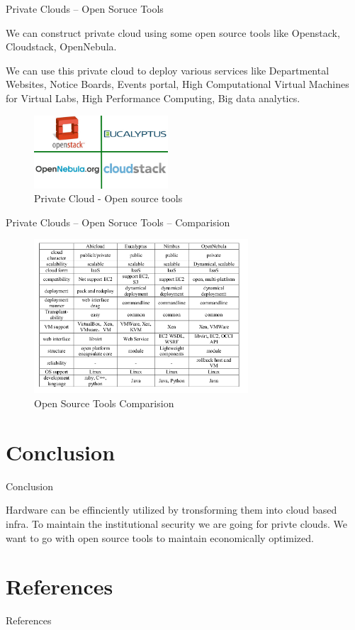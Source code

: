 \documentclass[xcolor=dvipsnames]{beamer}
\begin{document}
\begin{frame}{Private Clouds -- Open Soruce Tools}

We can construct private cloud using some open source tools like Openstack, Cloudstack, OpenNebula. \\

\hspace{4cm} 

We can use this private cloud to deploy various services like Departmental Websites, Notice Boards, Events portal, High Computational Virtual Machines for Virtual Labs, High Performance Computing, Big data analytics.
\begin{figure}[H]
 \centering
 \includegraphics[width=5cm]{./cloud.jpg}
 \caption{Private Cloud - Open source tools \label{fig:cloud} }
\end{figure}

\end{frame}

\begin{frame}{Private Clouds -- Open Soruce Tools -- Comparision}

\begin{figure}[H]
 \centering
 \includegraphics[width=8cm]{./comp.png}
 \caption{Open Source Tools Comparision \cite{ref_2,ref_1} \label{fig:Comparision of Open Source Tools}}
\end{figure}

\end{frame}

\section{Conclusion}
\begin{frame}{Conclusion}

Hardware can be effinciently utilized by tronsforming them into cloud based infra. To maintain the institutional security we are going for privte clouds. We want to go with open source tools to maintain economically optimized.
\end{frame}

\section{References}
\begin{frame}{References}
	
	  
\end{frame}
\end{document}
